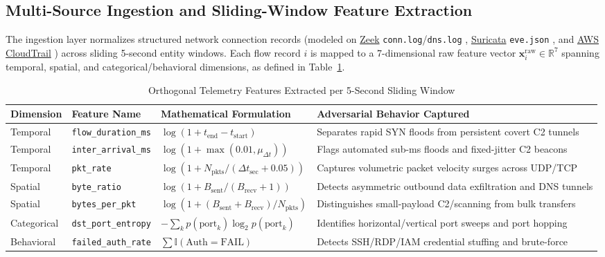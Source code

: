 \documentclass[10pt,a4paper]{article}
\begin{document}
\subsection{Multi-Source Ingestion and Sliding-Window Feature Extraction}
The ingestion layer normalizes structured network connection records (modeled on \href{https://docs.zeek.org/}{Zeek} \texttt{conn.log}/\texttt{dns.log} \cite{zeek}, \href{https://suricata.io/}{Suricata} \texttt{eve.json} \cite{suricata}, and \href{https://docs.aws.amazon.com/cloudtrail/}{AWS CloudTrail} \cite{cloudtrail}) across sliding 5-second entity windows. Each flow record $i$ is mapped to a 7-dimensional raw feature vector $\mathbf{x}_i^{\text{raw}} \in \mathbb{R}^7$ spanning temporal, spatial, and categorical/behavioral dimensions, as defined in Table~\ref{tab:features}.

\begin{table}[htbp]
\centering
\caption{Orthogonal Telemetry Features Extracted per 5-Second Sliding Window}
\label{tab:features}
\footnotesize
\renewcommand{\arraystretch}{1.22}
\begin{tabularx}{\textwidth}{l l l >{\raggedright\arraybackslash}X}
\toprule
\textbf{Dimension} & \textbf{Feature Name} & \textbf{Mathematical Formulation} & \textbf{Adversarial Behavior Captured} \\
\midrule
Temporal & \texttt{flow\_duration\_ms} & $\log(1 + t_{\text{end}} - t_{\text{start}})$ & Separates rapid SYN floods from persistent covert C2 tunnels \\
Temporal & \texttt{inter\_arrival\_ms} & $\log(1 + \max(0.01, \mu_{\Delta t}))$ & Flags automated sub-ms floods and fixed-jitter C2 beacons \\
Temporal & \texttt{pkt\_rate} & $\log(1 + N_{\text{pkts}} / (\Delta t_{\text{sec}} + 0.05))$ & Captures volumetric packet velocity surges across UDP/TCP \\
Spatial & \texttt{byte\_ratio} & $\log(1 + B_{\text{sent}} / (B_{\text{recv}} + 1))$ & Detects asymmetric outbound data exfiltration and DNS tunnels \\
Spatial & \texttt{bytes\_per\_pkt} & $\log(1 + (B_{\text{sent}} + B_{\text{recv}}) / N_{\text{pkts}})$ & Distinguishes small-payload C2/scanning from bulk transfers \\
Categorical & \texttt{dst\_port\_entropy} & $-\sum_{k} p(\text{port}_k) \log_2 p(\text{port}_k)$ & Identifies horizontal/vertical port sweeps and port hopping \\
Behavioral & \texttt{failed\_auth\_rate} & $\sum \mathbb{I}(\text{Auth} = \text{FAIL})$ & Detects SSH/RDP/IAM credential stuffing and brute-force \\
\bottomrule
\end{tabularx}
\end{table}
\end{document}
